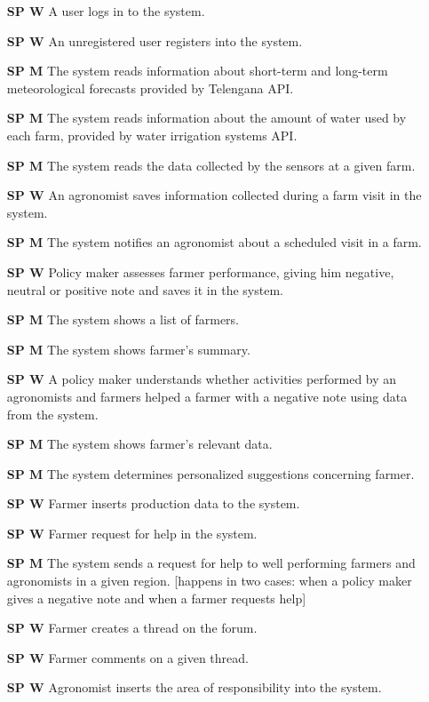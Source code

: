 \begin{itemize}
    \item [\textbf{SP W}] A user logs in to the system.
    \item [\textbf{SP W}] An unregistered user registers into the system.
    \item [\textbf{SP M}] The system reads information about short-term and long-term meteorological forecasts provided by Telengana API.
    \item [\textbf{SP M}] The system reads information about the amount of water used by each farm, provided by water irrigation systems API.
    \item [\textbf{SP M}] The system reads the data collected by the sensors at a given farm.
    \item [\textbf{SP W}] An agronomist saves information collected during a farm visit in the system.
    \item [\textbf{SP M}] The system notifies an agronomist about a scheduled visit in a farm.
    \item [\textbf{SP W}] Policy maker assesses farmer performance, giving him negative, neutral or positive note and saves it in the system.
    \item [\textbf{SP M}] The system shows a list of farmers.
    \item [\textbf{SP M}] The system shows farmer's summary.
    \item [\textbf{SP W}] A policy maker understands whether activities performed by an agronomists and farmers helped a farmer with a negative note using data from the system.
    \item [\textbf{SP M}] The system shows farmer's relevant data.
    \item [\textbf{SP M}] The system determines personalized suggestions concerning farmer.
    \item [\textbf{SP W}] Farmer inserts production data to the system.
    \item [\textbf{SP W}] Farmer request for help in the system.
    \item [\textbf{SP M}] The system sends a request for help to well performing farmers and agronomists in a given region. [happens in two cases: when a policy maker gives a negative note and when a farmer requests help]
    \item [\textbf{SP W}] Farmer creates a thread on the forum. 
    \item [\textbf{SP W}] Farmer comments on a given thread.
    \item [\textbf{SP W}] Agronomist inserts the area of responsibility into the system.

\end{itemize}
